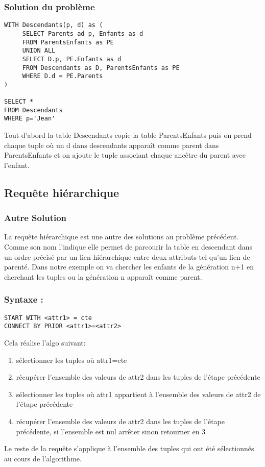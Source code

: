 \documentclass[10pt,a4paper,twoside]{article}
\begin{document}
\subsubsection{Solution du problème}
\begin{verbatim}
WITH Descendants(p, d) as (
     SELECT Parents ad p, Enfants as d
     FROM ParentsEnfants as PE
     UNION ALL
     SELECT D.p, PE.Enfants as d
     FROM Descendants as D, ParentsEnfants as PE
     WHERE D.d = PE.Parents
)

SELECT *
FROM Descendants
WHERE p='Jean'
\end{verbatim}

Tout d'abord la table Descendants copie la table ParentsEnfants puis on prend chaque tuple où un d dans descendants apparaît comme parent dans ParentsEnfants et on ajoute le tuple associant chaque ancêtre du parent avec l'enfant. 

\subsection{Requête hiérarchique}
\subsubsection{Autre Solution} 
La requête hiérarchique est une autre des solutions au problème précédent. Comme son nom l'indique elle permet de parcourir la table en descendant dans un ordre précisé par un lien hiérarchique entre deux attributs tel qu'un lien de parenté. Dans notre exemple on va chercher les enfants de la génération n+1 en cherchant les tuples ou la génération n apparaît comme parent.

\subsubsection{Syntaxe :} 
\begin{verbatim}
START WITH <attr1> = cte
CONNECT BY PRIOR <attr1>=<attr2>
\end{verbatim}
Cela réalise l'algo suivant:
\begin{enumerate}
\item sélectionner les tuples où attr1=cte
\item récupérer l'ensemble des valeurs de attr2 dans les tuples de l'étape précédente
\item sélectionner les tuples où attr1 appartient à l'ensemble des valeurs de attr2 de l'étape précédente
\item récupérer l'ensemble des valeurs de attr2 dans les tuples de l'étape précédente, si l'ensemble est nul arrêter sinon retourner en 3
\end{enumerate}
Le reste de la requête s'applique à l'ensemble des tuples qui ont été sélectionnés au cours de l'algorithme.
\end{document}
